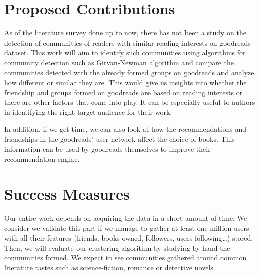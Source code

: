 \documentclass[11pt]{article}
\begin{document}







\section{Proposed Contributions}
As of the literature survey done up to now, there has not been a study on the detection of communities of readers with similar reading interests on goodreads dataset.
This work will aim to identify such communities using algorithms for community detection such as Girvan-Newman algorithm and compare the communities detected with the already formed groups on goodreads and analyze how different or similar they are.
This would give us insights into whether the friendship and groups formed on goodreads are based on reading interests or there are other factors that come into play. It can be especially useful to authors in identifying the right target audience for their work.

In addition, if we get time, we can also look at how the recommendations and friendships in the goodreads' user network affect the choice of books. This information can be used by goodreads themselves to improve their recommendation engine.

\section{Success Measures}

Our entire work depends on acquiring the data in a short amount of time. We consider we validate this part if we manage to gather at least one million users with all their features (friends, books owned, followers, users following\dots) stored.\\
Then, we will evaluate our clustering algorithm by studying by hand the communities formed. We expect to see communities gathered around common literature tastes such as science-fiction, romance or detective novels. 
\end{document}
